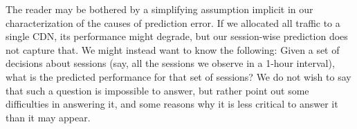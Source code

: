 \begin{figure}[t!]
\centering
{}
\label{fig:compare-to-naive}
\end{figure}



The reader may be bothered by a simplifying assumption implicit in our characterization of the causes of prediction error.  If we allocated all traffic to a single CDN, its performance might degrade, but our session-wise prediction does not capture that.  We might instead want to know the following: Given a set of decisions about sessions (say, all the sessions we observe in a 1-hour interval), what is the predicted performance for that set of sessions?  We do not wish to say that such a question is impossible to answer, but rather point out some difficulties in answering it, and some reasons why it is less critical to answer it than it may appear.

